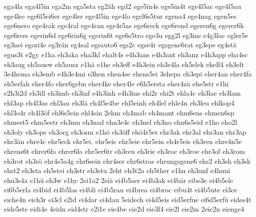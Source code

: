 {    ega4la
    ega4l5in
    ega2m
    ega5sta
    eg2äh
    egd2
    ege5in4s
    ege5in4t
    ege4l5ac
    ege4l5au
    ege4lec
    ege6l5ei6er
    ege4ler
    ege4l5in
    ege4lo
    egel6s5tur
    egena4
    ege4nag
    egen5ec
    ege6nero
    ege4rak
    ege4ral
    ege4ran
    ege4r5as
    ege6reck
    ege6rend
    egeren6g
    egerer6k
    ege6rers
    egerin6d
    ege6rin6g
    egerin6t
    ege6s5tro
    ege3u
    egg2l
    eg3ins
    e4g3lac
    egler5e
    eg3nei
    egori4e
    eg3rän
    eg4sal
    egsauto6
    egs2c
    egse4r
    egsgene6rat
    eg3spe
    eg4stä
    egus3t
    e2gy
    e1ha
    eh3aka
    eha3kl
    ehalt4s
    e4h3ans
    e4h3ant
    eh3anz
    e4h3app
    eha4sc
    eh3aug
    eh5ausw
    eh5ausz
    e1hä
    e1he
    eh3eff
    e4h3ein
    eh3e4la
    eh5elek
    ehelf4
    eh3elt
    3e4hema
    eh3emb
    e4h3e4mi
    e3hen
    ehen4se
    ehens5ei
    3ehepa
    eh3epi
    eher4an
    eher4fa
    eh5erfah
    eher4fo
    eher6gebn
    eher4ke
    eher4le
    e6h5ersta
    eher4zä
    ehe5str
    e1hi
    e2h3i2d
    eh3ill
    eh3imb
    eh3inf
    e4h3inh
    e4h3ins
    ehi2r
    ehi2t
    ehla4c
    eh3lae
    eh3lam
    ehl3ap
    eh4l3as
    ehl3au
    eh3lä
    eh4l5e4be
    ehl5einh
    eh4lel
    ehle4n
    eh3leu
    ehlkop4
    ehl3o4r
    eh4l3öf
    ehl6s5ein
    ehl4sin
    2ehm
    eh4mab
    eh4mant
    ehm6ens
    ehmen6sp
    ehmest5
    ehm5estr
    eh3mu
    eh3nad
    ehn3e4c
    eh3nel
    eh3no
    ehn6s5eid
    e1ho
    eho2l
    eh3oly
    eh3ope
    eh3org
    eh3osm
    e1hö
    eh3öff
    ehö4r5er
    ehr3ak
    ehr3al
    ehr3an
    ehr3ap
    ehr3än
    ehre4c
    ehr5eck
    ehr5ei.
    ehr5eic
    ehr5eie
    ehr5ein
    eh4r5eis
    eh3ren
    ehre4n5e
    ehrens6t
    ehrer6fa
    ehrer6la
    ehr5er6tr
    eh3reu
    eh3rie
    eh3roc
    eh3roe
    ehr3of
    eh3rom
    eh3rot
    eh3rö
    ehr4s5a4g
    ehr6sein
    ehr4ser
    ehr6stras
    ehrungsgene6
    ehs2
    eh3sh
    eh3sk
    ehst2
    eh3sta
    eh5stei
    eh3str
    eh3stu
    2eht
    eh3t2a
    eh5ther
    e1hu
    eh3unf
    e4huni
    ehu3s4a
    e1hü
    eh3w
    e1hy
    2ei1a2
    2eiä
    ei4b5aer
    ei4b3ak
    ei4bär
    eibe3e
    ei4b5ele
    ei6b5erla
    ei4bid
    ei4b5las
    ei4bli
    ei4b5rau
    ei4brea
    ei4broc
    eibu4t
    ei4b5ute
    ei3ce
    eiche4n
    eich3r
    ei3cl
    e2id
    ei4dar
    ei4dau
    5eidech
    ei4d5eis
    eid5erfue
    ei6d5erfü
    eides4t
    eide5ste
    eidi4e
    4eidn
    eid4str
    e2i1e
    eie4be
    eie2d
    eie3f4
    eie2l
    eie2m
    2eie2n
    eienge4
}
